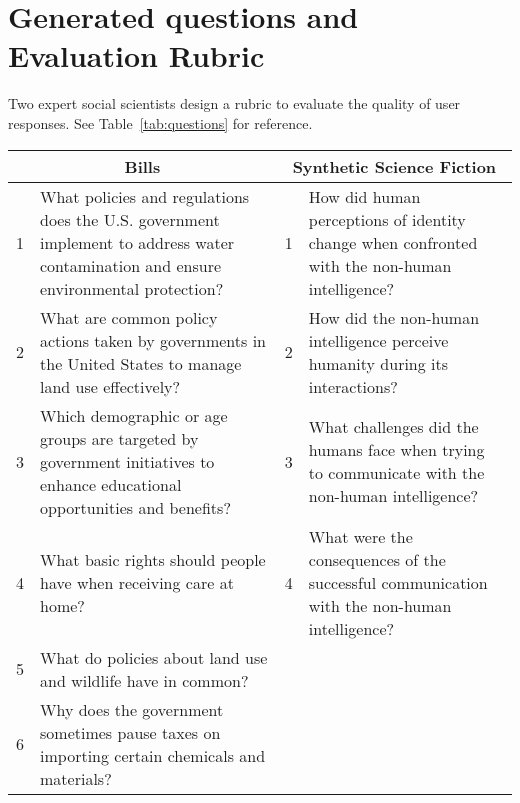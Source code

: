 \section{Generated questions and Evaluation Rubric}
Two expert social scientists design a rubric to evaluate the quality of user responses. 
%
See Table~\ref{tab:questions} for reference.

\label{appendix:rubric}
\begin{table*}[h]
    \centering
    \tiny
    \renewcommand{\arraystretch}{1.2}
    \begin{tabular}{p{}p{}|p{}p{}}
    \toprule
    \multicolumn{2}{c}{{\bf Bills}} & \multicolumn{2}{c}{{\bf Synthetic Science Fiction}} \\
    \midrule
    1 &  What policies and regulations does the U.S. government implement to address water contamination and ensure environmental protection? & 1 & How did human perceptions of identity change when confronted with the non-human intelligence? \\
    2 & What are common policy actions taken by governments in the United States to manage land use effectively? & 2 & How did the non-human intelligence perceive humanity during its interactions? \\
    3 & Which demographic or age groups are targeted by government initiatives to enhance educational opportunities and benefits? & 3 & What challenges did the humans face when trying to communicate with the non-human intelligence? \\
    4 & What basic rights should people have when receiving care at home? & 4 & What were the consequences of the successful communication with the non-human intelligence? \\
    5 & What do policies about land use and wildlife have in common? & \multicolumn{2}{c}{} \\
    6 & Why does the government sometimes pause taxes on importing certain chemicals and materials? & \multicolumn{2}{c}{} \\
    \bottomrule
    \end{tabular}
    \caption{Pre-test and post-test questions for both datasets. The test questions are testing the users' understanding of topics in the dataset, not testing users' ability to find a specific document to find the answer.}
    \label{tab:questions}
\end{table*}


